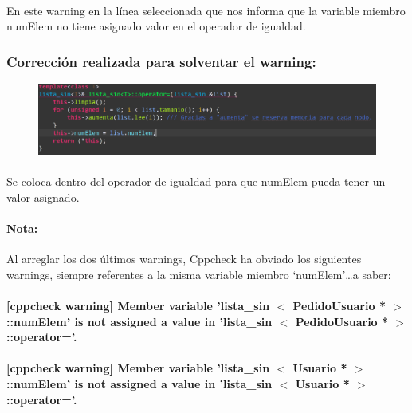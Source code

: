 			\paragraph{}En este warning en la línea seleccionada que nos informa que la variable miembro numElem no tiene asignado valor en el operador de igualdad.
			
		\subsubsection{Corrección realizada para solventar el warning:}
		
			\begin{figure}[H]
				\centering
				\includegraphics[scale=0.55]{img/esteban7.png}
				\label{esteban7}
			\end{figure}
		
			\paragraph{}Se coloca dentro del operador de igualdad para que numElem pueda tener un valor asignado.
			
			\paragraph{Nota:}Al arreglar los dos últimos warnings,  Cppcheck ha obviado los siguientes warnings, siempre referentes a la misma variable miembro ‘numElem’…a saber:
			
			\paragraph{[cppcheck warning] Member variable 'lista\_sin $<$ PedidoUsuario * $>$::numElem' is not assigned a value in 'lista\_sin $<$ PedidoUsuario * $>$::operator='.	}
			
			\paragraph{[cppcheck warning] Member variable 'lista\_sin $<$ Usuario * $>$::numElem' is not assigned a value in 'lista\_sin $<$ Usuario * $>$::operator='.}
			
